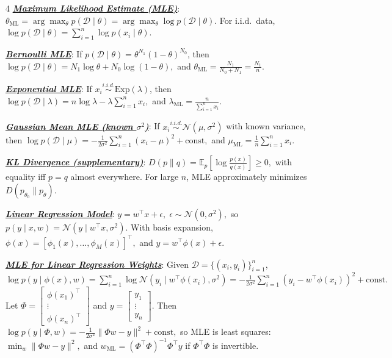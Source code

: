 \documentclass[12pt]{article}
\newcommand{\bulletPoint}[1]{\underline{\textit{\textbf{#1}}}}
\begin{document}
\begin{multicols*}{4}
\bulletPoint{Maximum Likelihood Estimate (MLE)}:
$\theta_{\mathrm{ML}}=\arg\max_{\theta} p(\mathcal D\mid \theta)
=\arg\max_{\theta}\log p(\mathcal D\mid \theta).$
For i.i.d.\ data,
$\log p(\mathcal D\mid \theta)=\sum_{i=1}^n \log p(x_i\mid \theta).$

\bulletPoint{Bernoulli MLE}:
If $p(\mathcal D\mid \theta)=\theta^{N_1}(1-\theta)^{N_0}$, then
$\log p(\mathcal D\mid \theta)=N_1\log\theta+N_0\log(1-\theta),$
and
$\theta_{\mathrm{ML}}=\frac{N_1}{N_0+N_1}=\frac{N_1}{n}.$

\bulletPoint{Exponential MLE}:
If $x_i\overset{i.i.d.}{\sim}\mathrm{Exp}(\lambda)$, then
$\log p(\mathcal D\mid \lambda)=n\log\lambda-\lambda\sum_{i=1}^n x_i,$
and
$\lambda_{\mathrm{ML}}=\frac{n}{\sum_{i=1}^n x_i}.$

\bulletPoint{Gaussian Mean MLE (known $\sigma^2$)}:
If $x_i\overset{i.i.d.}{\sim}\mathcal N(\mu,\sigma^2)$ with known variance, then
$\log p(\mathcal D\mid \mu)=
-\frac{1}{2\sigma^2}\sum_{i=1}^n (x_i-\mu)^2+\mathrm{const},$
and
$\mu_{\mathrm{ML}}=\frac{1}{n}\sum_{i=1}^n x_i.$

\bulletPoint{KL Divergence (supplementary)}:
$D(p\|q)=\mathbb E_p\!\left[\log\frac{p(x)}{q(x)}\right]\ge 0,$
with equality iff $p=q$ almost everywhere.
For large $n$, MLE approximately minimizes $D(p_{\theta_0}\|p_\theta).$

\bulletPoint{Linear Regression Model}:
$y=w^\top x+\epsilon,\;\epsilon\sim \mathcal N(0,\sigma^2),$
so
$p(y\mid x,w)=\mathcal N(y\mid w^\top x,\sigma^2).$
With basis expansion,
$\phi(x)=[\phi_1(x),\dots,\phi_M(x)]^\top,$
and
$y=w^\top\phi(x)+\epsilon.$

\bulletPoint{MLE for Linear Regression Weights}:
Given $\mathcal D=\{(x_i,y_i)\}_{i=1}^n$,
\textcolor{blue!50!black}{$\textstyle
\log p(y\mid \phi(x),w)
=
\sum_{i=1}^n \log \mathcal N(y_i\mid w^\top \phi(x_i),\sigma^2)
=
-\frac{1}{2\sigma^2}\sum_{i=1}^n (y_i-w^\top \phi(x_i))^2+\mathrm{const}.
$}
Let
$\Phi=
\begin{bmatrix}
\phi(x_1)^\top\\
\vdots\\
\phi(x_n)^\top
\end{bmatrix}$
and
$y=
\begin{bmatrix}
y_1\\
\vdots\\
y_n
\end{bmatrix}.$
Then
$\log p(y\mid \Phi,w)= -\frac{1}{2\sigma^2}\|\Phi w-y\|^2+\mathrm{const},$
so MLE is least squares:
$\min_w \|\Phi w-y\|^2,$
and
\textcolor{purple!60!black}{$\textstyle
w_{\mathrm{ML}}=(\Phi^\top\Phi)^{-1}\Phi^\top y
$}
if $\Phi^\top\Phi$ is invertible.


\end{multicols*}
\end{document}
